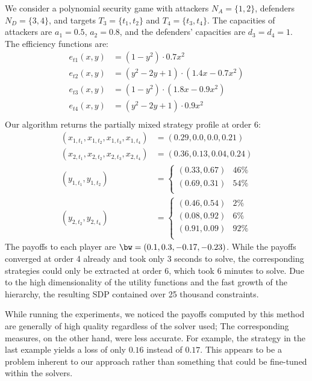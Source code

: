 \begin{example}
   We consider a polynomial security game with attackers $N_A=\{1,2\}$, defenders $N_D=\{3,4\}$, and targets $T_3=\{t_1,t_2\}$ and $T_4=\{t_3,t_4\}$. The capacities of attackers are $a_1=0.5$, $a_2=0.8$, and the defenders' capacities are $d_3=d_4=1$. The efficiency functions are:
    \begin{equation*}\begin{aligned}
        e_{t1}(x,y) &= (1-y^2)\cdot 0.7x^2\\
        e_{t2}(x,y) &= (y^2 -2y +1)\cdot (1.4x - 0.7x^2)\\
        e_{t3}(x,y) &= (1-y^2)\cdot (1.8x - 0.9x^2)\\
        e_{t4}(x,y) &= (y^2 -2y +1)\cdot 0.9x^2\\
    \end{aligned}\end{equation*}
    Our algorithm returns the partially mixed strategy profile at order 6:
    \[\begin{aligned}
        (x_{1,t_1}, x_{1,t_2}, x_{1,t_3}, x_{1,t_4}) &=
            (0.29, 0.0, 0.0, 0.21) \\
        (x_{2,t_1}, x_{2,t_2}, x_{2,t_3}, x_{2,t_4}) &=
            (0.36, 0.13, 0.04, 0.24) \\
        (y_{1,t_1}, y_{1,t_2}) &=\begin{cases}
            (0.33, 0.67) &46\%\\
            (0.69, 0.31) &54\%\\
        \end{cases}\\
        (y_{2,t_2}, y_{2,t_4}) &=\begin{cases}
            (0.46, 0.54) &2\%\\
            (0.08, 0.92) &6\%\\
            (0.91, 0.09) &92\%\\
        \end{cases}
    \end{aligned}\]
    The payoffs to each player are $\bw = (0.1, 0.3, -0.17, -0.23)$. While the payoffs converged at order 4 already and took only 3 seconds to solve, the corresponding strategies could only be extracted at order 6, which took 6 minutes to solve. Due to the high dimensionality of the utility functions and the fast growth of the hierarchy, the resulting SDP contained over 25 thousand constraints.
\end{example}

While running the experiments, we noticed the payoffs computed by this method are generally of high quality regardless of the solver used; The corresponding measures, on the other hand, were less accurate. For example, the strategy in the last example yields a loss of only $0.16$ instead of $0.17$. This appears to be a problem inherent to our approach rather than something that could be fine-tuned within the solvers.
